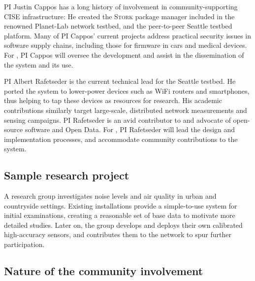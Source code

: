 PI Justin Cappos has a long history of involvement in
community-supporting CISE infrastructure: He created the \textsc{Stork}
package manager included in the renowned Planet-Lab network testbed,
and the peer-to-peer Seattle testbed platform.
Many of PI Cappos' current projects address practical security issues
in software supply chains, including those for firmware in cars and
medical devices. For \sysname, PI Cappos will oversee the development
and assist in the dissemination of the system and its use.

PI Albert Rafetseder is the current technical lead for the Seattle
testbed. He ported the system to lower-power devices such as WiFi
routers and smartphones, thus helping to tap these devices as
resources for research.
His academic contributions similarly target large-scale, distributed
network measurements and sensing campaigns. PI Rafetseder is an avid
contributor to and advocate of open-source software and Open Data.
For \sysname, PI Rafetseder will lead the design and implementation
processes, and accommodate community contributions to the system.



\subsection{Sample research project}

A research group investigates noise levels and air quality in
urban and countryside settings. Existing \sysname installations
provide a simple-to-use system for initial examinations, creating
a reasonable set of base data to motivate more detailed studies.
Later on, the group develops and deploys their own calibrated
high-accuracy sensors, and contributes them to the \sysname network
to spur further participation.



\subsection{Nature of the community involvement}

